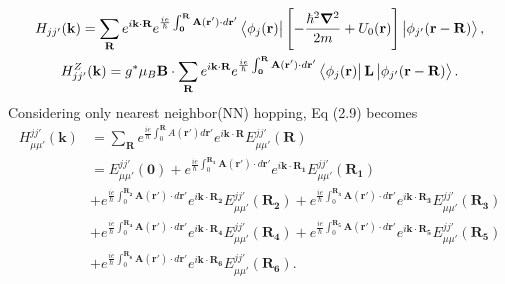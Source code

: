 \documentclass{report}
\newcommand{\f}[2]{\dfrac{#1}{#2}}
\begin{document}
\begin{gather}
	H_{jj'}(\mathbf{k})
	= \sum_{\mathbf{R}} e^{i \mathbf{k \cdot R}} e^{\frac{ie}{\hbar} \int_{\mathbf{0}}^{\mathbf{R}} \mathbf{A(\mathbf{r'})} \cdot d \mathbf{r'} } \bra{\phi_{j}(\mathbf{r})} \left[ -\f{\hbar^{2} \boldsymbol{\nabla}^{2}}{2m} + U_{0} (\mathbf{r}) \right] \ket{\phi_{j'}(\mathbf{r - R})},\\
	H_{jj'}^{Z}(\mathbf{k})
	= g^{*} \mu_{B} \mathbf{B} \cdot \sum_{\mathbf{R}} e^{i\mathbf{k\cdot R}} e^{\frac{ie}{\hbar} \int_{\mathbf{0}}^{\mathbf{R}} \mathbf{A(\mathbf{r'})} \cdot d\mathbf{r'} } \bra{\phi_{j}(\mathbf{r})} \mathbf{L} \ket{\phi_{j'}(\mathbf{r - R})}.
\end{gather}
Considering only nearest neighbor(NN) hopping, Eq (2.9) becomes
\begin{equation}
	\begin{aligned}
		H_{\mu\mu'}^{jj'}(\mathbf{k})
		& = \sum_{\mathbf{R}} e^{\frac{ie}{\hbar}\int_{0}^{\mathbf{R}}A(\mathbf{r'})d\mathbf{r'}}e^{i\mathbf{k\cdot R}} E_{\mu\mu'}^{jj'}(\mathbf{R})\\
		& = E_{\mu\mu'}^{jj'}(\mathbf{0}) + e^{\frac{ie}{\hbar}\int_{0}^{\mathbf{R_1}}\mathbf{A(\mathbf{r'})}\cdot d\mathbf{r'}}e^{i\mathbf{k\cdot R_1}} E_{\mu\mu'}^{jj'}(\mathbf{R_1})  \\
		& + e^{\frac{ie}{\hbar}\int_{0}^{\mathbf{R_2}}\mathbf{A(\mathbf{r'})}\cdot d\mathbf{r'}}e^{i\mathbf{k\cdot R_2}} E_{\mu\mu'}^{jj'}(\mathbf{R_2}) + e^{\frac{ie}{\hbar}\int_{0}^{\mathbf{R_3}}\mathbf{A(\mathbf{r'})}\cdot d\mathbf{r'}}e^{i\mathbf{k\cdot R_3}} E_{\mu\mu'}^{jj'}(\mathbf{R_3}) \\
		&+ e^{\frac{ie}{\hbar}\int_{0}^{\mathbf{R_4}}\mathbf{A(\mathbf{r'})}\cdot d\mathbf{r'}}e^{i\mathbf{k\cdot R_4}} E_{\mu\mu'}^{jj'}(\mathbf{R_4}) + e^{\frac{ie}{\hbar}\int_{0}^{\mathbf{R_5}}\mathbf{A(\mathbf{r'})}\cdot d\mathbf{r'}}e^{i\mathbf{k\cdot R_5}} E_{\mu\mu'}^{jj'}(\mathbf{R_5}) \\
		&+ e^{\frac{ie}{\hbar}\int_{0}^{\mathbf{R_6}}\mathbf{A(\mathbf{r'})}\cdot d\mathbf{r'}}e^{i\mathbf{k\cdot R_6}} E_{\mu\mu'}^{jj'}(\mathbf{R_6}).
	\end{aligned}
\end{equation}
\end{document}
